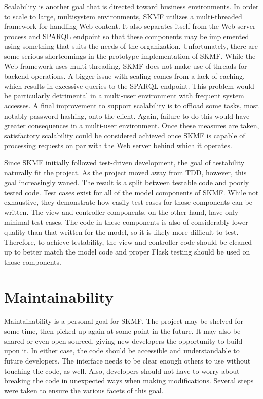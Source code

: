 Scalability is another goal that is directed toward business environments. In order to scale to large, multisystem environments, SKMF utilizes a multi-threaded framework for handling Web content. It also separates itself from the Web server process and SPARQL endpoint so that these components may be implemented using something that suits the needs of the organization. Unfortunately, there are some serious shortcomings in the prototype implementation of SKMF. While the Web framework uses multi-threading, SKMF does not make use of threads for backend operations. A bigger issue with scaling comes from a lack of caching, which results in excessive queries to the SPARQL endpoint. This problem would be particularly detrimental in a multi-user environment with frequent system accesses. A final improvement to support scalability is to offload some tasks, most notably password hashing, onto the client. Again, failure to do this would have greater consequences in a multi-user environment. Once these measures are taken, satisfactory scalability could be considered achieved once SKMF is capable of processing requests on par with the Web server behind which it operates.

Since SKMF initially followed test-driven development, the goal of testability naturally fit the project. As the project moved away from TDD, however, this goal increasingly waned. The result is a split between testable code and poorly tested code. Test cases exist for all of the model components of SKMF. While not exhaustive, they demonstrate how easily test cases for those components can be written. The view and controller components, on the other hand, have only minimal test cases. The code in these components is also of considerably lower quality than that written for the model, so it is likely more difficult to test. Therefore, to achieve testability, the view and controller code should be cleaned up to better match the model code and proper Flask testing should be used on those components.


\section{Maintainability}
\label{result:maintain}

Maintainability is a personal goal for SKMF. The project may be shelved for some time, then picked up again at some point in the future. It may also be shared or even open-sourced, giving new developers the opportunity to build upon it. In either case, the code should be accessible and understandable to future developers. The interface needs to be clear enough others to use without touching the code, as well. Also, developers should not have to worry about breaking the code in unexpected ways when making modifications. Several steps were taken to ensure the various facets of this goal.

